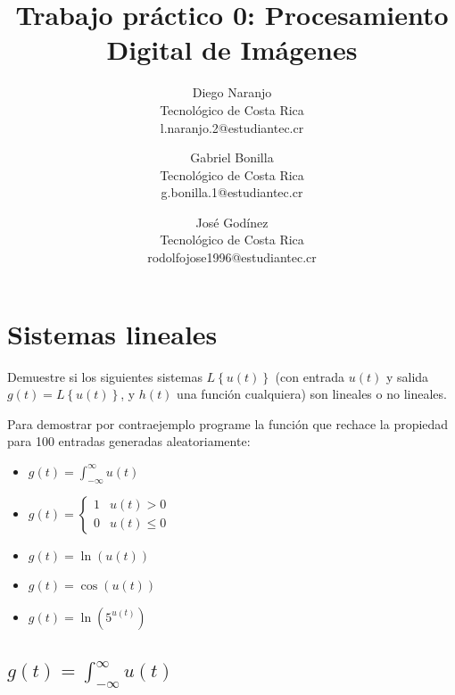 \documentclass[12pt,a4paper]{article}
\begin{document}
\title{Trabajo práctico 0: Procesamiento Digital de Imágenes}

\author{
    Diego Naranjo \\ Tecnológico de Costa Rica \\ l.naranjo.2@estudiantec.cr
    \and Gabriel Bonilla \\ Tecnológico de Costa Rica \\ g.bonilla.1@estudiantec.cr
    \and José Godínez \\ Tecnológico de Costa Rica \\ rodolfojose1996@estudiantec.cr
}


%

\maketitle


\section{Sistemas lineales}

Demuestre si los siguientes sistemas $L\left\{ u(t)\right\} $ (con entrada $u(t)$ y salida $g(t)=L\left\{ u(t)\right\} $, y $h(t)$ una función cualquiera) son lineales o no lineales.

Para demostrar por contraejemplo programe la función que rechace la propiedad para 100 entradas generadas aleatoriamente:

\begin{itemize}
    \item $g\left(t\right)=\int_{-\infty}^{\infty}u(t)$
    \item $g\left(t\right)=\begin{cases} 1 & u(t)>0\\ 0 & u(t)\leq0 \end{cases}\,$
    \item $g\left(t\right)=\ln\left(u(t)\right)$
    \item $g\left(t\right)=\cos\left(u(t)\right)$
    \item $g\left(t\right)=\ln\left(5^{u(t)}\right)$
\end{itemize}

\subsection{$g(t)=\int^{\infty}_{-\infty}u(t)$}
\end{document}
